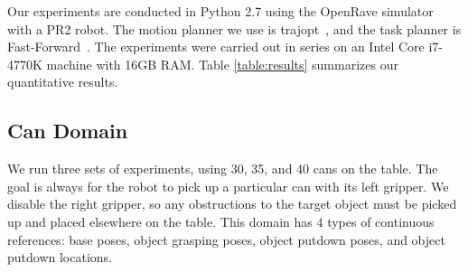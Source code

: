 Our experiments are conducted in Python 2.7 using the OpenRave
simulator~\cite{Diankov_2008_6117} with a PR2 robot.  The motion
planner we use is trajopt~\cite{schulman2013finding}, and the task
planner is Fast-Forward~\cite{FF}.  The experiments were carried out
in series on an Intel Core i7-4770K machine with 16GB RAM.  Table
\ref{table:results} summarizes our quantitative results.


\subsection{Can Domain}
We run three sets of experiments, using 30, 35, and 40 cans on the
table.  The goal is always for the robot to pick up a particular can
with its left gripper. We disable the right gripper, so any
obstructions to the target object must be picked up and placed
elsewhere on the table. This domain has 4 types of continuous
references: base poses, object grasping poses, object putdown poses,
and object putdown locations.

